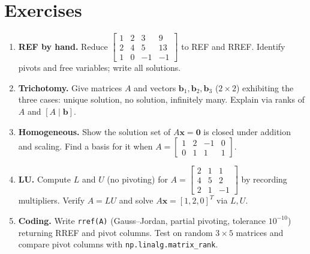 \section{Exercises}
\label{sec:ch03-exercises}
\begin{enumerate}[label=E3.\arabic*, leftmargin=*, itemsep=0.8em]
\item \textbf{REF by hand.} Reduce $\begin{bmatrix}1&2&3&9\\2&4&5&13\\1&0&-1&-1\end{bmatrix}$ to REF and RREF. Identify pivots and free variables; write all solutions.
\item \textbf{Trichotomy.} Give matrices $A$ and vectors $\mathbf{b}_1,\mathbf{b}_2,\mathbf{b}_3$ ($2\times2$) exhibiting the three cases: unique solution, no solution, infinitely many. Explain via ranks of $A$ and $[A\mid\mathbf{b}]$.
\item \textbf{Homogeneous.} Show the solution set of $A\mathbf{x}=\mathbf{0}$ is closed under addition and scaling. Find a basis for it when $A=\begin{bmatrix}1&2&-1&0\\0&1&1&1\end{bmatrix}$.
\item \textbf{LU.} Compute $L$ and $U$ (no pivoting) for $A=\begin{bmatrix}2&1&1\\4&5&2\\2&1&-1\end{bmatrix}$ by recording multipliers. Verify $A=LU$ and solve $A\mathbf{x}=[1,2,0]^T$ via $L,U$.
\item \textbf{Coding.} Write \texttt{rref(A)} (Gauss--Jordan, partial pivoting, tolerance $10^{-10}$) returning RREF and pivot columns. Test on random $3\times5$ matrices and compare pivot columns with \texttt{np.linalg.matrix\_rank}.
\end{enumerate}
